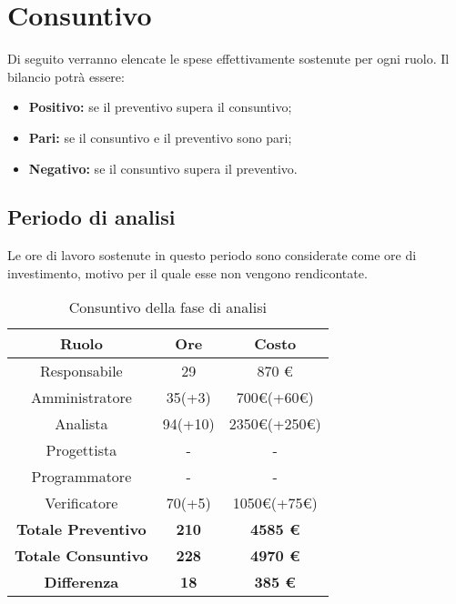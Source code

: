 \section{Consuntivo}
Di seguito verranno elencate le spese effettivamente sostenute per ogni ruolo. Il bilancio potrà essere:
\begin{itemize}
\item \textbf{Positivo:} se il preventivo supera il consuntivo;
\item \textbf{Pari:} se il consuntivo e il preventivo sono pari;
\item \textbf{Negativo:} se il consuntivo supera il preventivo.
\end{itemize}

\subsection{Periodo di analisi}
Le ore di lavoro sostenute in questo periodo sono considerate come ore di investimento, motivo per il quale esse non vengono rendicontate.
\begin{table}[H]
		\begin{center}
			\setlength{\aboverulesep}{0pt}
			\setlength{\belowrulesep}{0pt}
			\setlength{\extrarowheight}{.75ex}
			\begin{tabular}{ c c c }
				\rowcolor{AzzurroGruppo!30} 
				\textbf{Ruolo} & \textbf{Ore} & \textbf{Costo}  \\
				\toprule
				Responsabile & 29 & 870 \euro \\
				Amministratore & 35(+3) & 700\euro(+60\euro) \\
				Analista & 94(+10) & 2350\euro(+250\euro) \\
				Progettista & - & - \\
				Programmatore & - & - \\
				Verificatore & 70(+5) & 1050\euro(+75\euro) \\
				\textbf{Totale Preventivo} & \textbf{210} & \textbf{4585 \euro} \\
				\textbf{Totale Consuntivo} & \textbf{228} & \textbf{4970 \euro} \\
				\textbf{Differenza} & \textbf{18} & \textbf{385 \euro} \\
				\bottomrule
			\end{tabular}
			\caption{Consuntivo della fase di analisi}
		\end{center}
\end{table}

